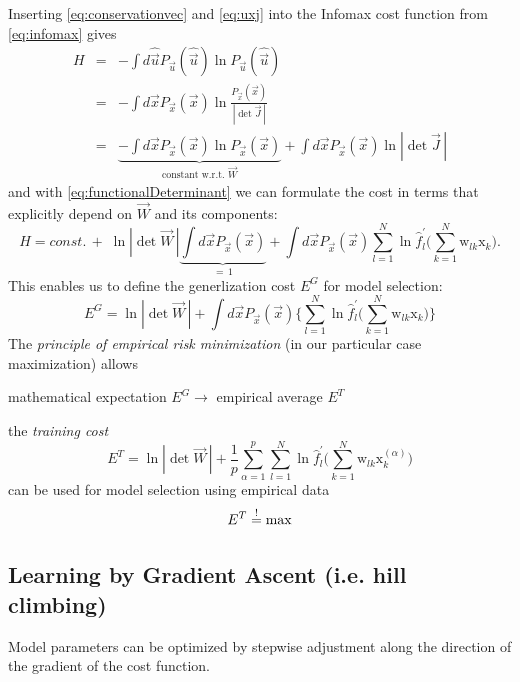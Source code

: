 \clearpage

Inserting \eqref{eq:conservationvec} and \eqref{eq:uxj} into the Infomax cost function from \eqref{eq:infomax} gives 
\begin{eqnarray}
H & = & -\int d \widehat{\vec{u}} P_{\vec{u}} (\widehat{\vec{u}})
  \ln P_{\vec{u}} (\widehat{\vec{u}}) \\
& = &  
-\int d \vec{x} P_{\vec{x}} (\vec{x}) \ln \frac{P_{\vec{x}}(\vec{x})}{|\det \vec{J}\,|} \\
& = & 
\underbrace{
    -\int d \vec{x} P_{\vec{x}} (\vec{x}) \ln P_{\vec{x}}(\vec{x})
}_{ \text{constant w.r.t. } \vec W } 
    + \int d \vec{x} P_{\vec{x}} (\vec{x}) \ln |\det \vec{J}\,|
\end{eqnarray}
and with \eqref{eq:functionalDeterminant} we can formulate the cost 
in terms that explicitly depend on $\vec W$ and its components:
\begin{equation}
	H = const. \, + \; \ln |\det \vec{W}\,| \underbrace{\int d \vec{x} P_{\vec{x}} (\vec{x})}_{=\,1}
		+ \int d \vec{x} P_{\vec{x}} (\vec{x}) \sum\limits_{l = 1}^N
			\ln \widehat{f}_l^{'} \Bigg( \sum\limits_{k = 1}^N 
			\mathrm{w}_{lk} \mathrm{x}_k \Bigg).
\end{equation}
This enables us to define the generlization cost $E^G$ for model selection:
\begin{equation} \tag{generalization cost}
	E^G = \ln |\det \vec W\,| + \int d \vec{x} P_{\vec{x}} (\vec{x})
		\Bigg\{ \sum\limits_{l = 1}^N \ln
			\widehat{f}_l^{'} \Bigg( \sum\limits_{k = 1}^N 
			\mathrm{w}_{lk} \mathrm{x}_k \Bigg)
		\Bigg\}
\end{equation}
The \emph{principle of empirical risk minimization} (in our particular case maximization) allows
\begin{center}
mathematical expectation $E^G \longrightarrow$ empirical average $E^T$
\end{center}
the \emph{training cost}
\begin{equation} \label{eq:trainingCost}
	E^T = \ln |\det \vec{W}\,| + \frac{1}{p} \sum\limits_{\alpha = 1}^p
		\sum\limits_{l = 1}^N \ln \widehat{f}_l^{'} \Bigg( 
		\sum\limits_{k = 1}^N \mathrm{w}_{lk} 
		\mathrm{x}_k^{(\alpha)} \Bigg)
\end{equation}
can be used for model selection using empirical data 
\begin{equation}
E^T \stackrel{\mathrm{!}}{=} \max
\end{equation}

\newpage

\subsection{Learning by Gradient Ascent (i.e. hill climbing)}
Model parameters can be optimized by stepwise adjustment along the direction of the gradient of the cost function. 

